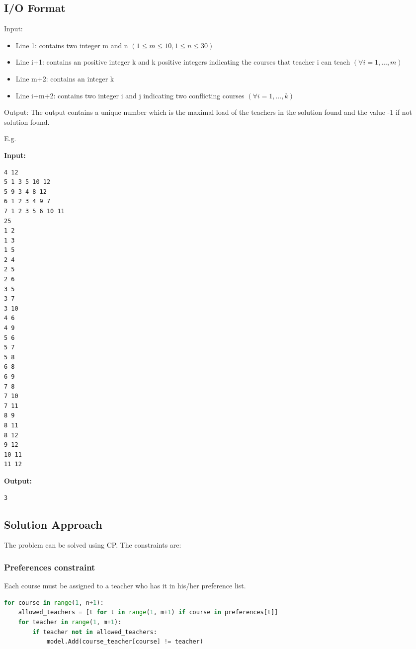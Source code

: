 \documentclass{article}
\begin{document}
\subsection{I/O Format}
Input:
\begin{itemize}
    \item Line 1: contains two integer m and n $(1\le m \le 10, 1 \le n \le 30)$
    \item Line i+1: contains an positive integer k and k positive integers indicating the courses that teacher i can teach $(\forall i=1,\ldots,m)$
    \item Line m+2: contains an integer k
    \item Line i+m+2: contains two integer i and j indicating two conflicting courses $(\forall i=1,\ldots,k)$
\end{itemize}
Output: The output contains a unique number which is the maximal load of the teachers in the solution found and the value -1 if not solution found.
\pagebreak

E.g.
\begin{multicols}{2}
\textbf{Input:}
\begin{verbatim}
4 12
5 1 3 5 10 12
5 9 3 4 8 12
6 1 2 3 4 9 7
7 1 2 3 5 6 10 11
25
1 2
1 3
1 5
2 4
2 5
2 6
3 5
3 7
3 10
4 6
4 9
5 6
5 7
5 8
6 8
6 9
7 8
7 10
7 11
8 9
8 11
8 12
9 12
10 11
11 12
\end{verbatim}
\columnbreak
\textbf{Output:}
\begin{verbatim}
3
\end{verbatim}
\end{multicols}

\subsection{Solution Approach}
The problem can be solved using CP. The constraints are:
\subsubsection{Preferences constraint}
Each course must be assigned to a teacher who has it in his/her preference list.
\pagebreak
\begin{lstlisting}[language=Python]
for course in range(1, n+1):
    allowed_teachers = [t for t in range(1, m+1) if course in preferences[t]]
    for teacher in range(1, m+1):
        if teacher not in allowed_teachers:
            model.Add(course_teacher[course] != teacher)
\end{lstlisting}
\end{document}
